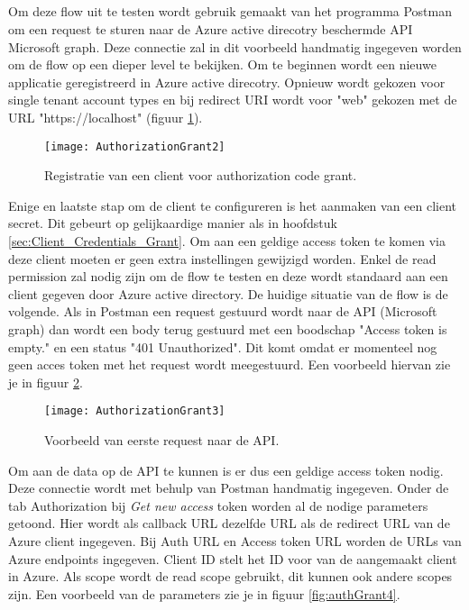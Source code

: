 \subsection{}
Om deze flow uit te testen wordt gebruik gemaakt van het programma Postman om een request te sturen naar de Azure active direcotry beschermde API Microsoft graph. Deze connectie zal in dit voorbeeld handmatig ingegeven worden om de flow op een dieper level te bekijken. Om te beginnen wordt een nieuwe applicatie geregistreerd in Azure active direcotry. Opnieuw wordt gekozen voor single tenant account types en bij redirect URI wordt voor "web" gekozen met de URL "https://localhost" (figuur \ref{fig:authGrant2}).\newpage
\begin{figure}[H]
	\centering
	\texttt{[image: AuthorizationGrant2]} 
	\caption[AthorizationGrant2]{Registratie van een client voor authorization code grant.}
	\label{fig:authGrant2}
	\scriptsize
\end{figure}
Enige en laatste stap om de client te configureren is het aanmaken van een client secret. Dit gebeurt op gelijkaardige manier als in hoofdstuk \ref{sec:Client_Credentials_Grant}. Om aan een geldige access token te komen via deze client moeten er geen extra instellingen gewijzigd worden. Enkel de read permission zal nodig zijn om de flow te testen en deze wordt standaard aan een client gegeven door Azure active directory.\newline
De huidige situatie van de flow is de volgende. Als in Postman een request gestuurd wordt naar de API (Microsoft graph) dan wordt een body terug gestuurd met een boodschap "Access token is empty." en een status "401 Unauthorized". Dit komt omdat er momenteel nog geen acces token met het request wordt meegestuurd. Een voorbeeld hiervan zie je in figuur \ref{fig:authGrant3}.
\begin{figure}[H]
	\centering
	\texttt{[image: AuthorizationGrant3]} 
	\caption[AthorizationGrant3]{Voorbeeld van eerste request naar de API.}
	\label{fig:authGrant3}
	\scriptsize
\end{figure}
Om aan de data op de API te kunnen is er dus een geldige access token nodig. Deze connectie wordt met behulp van Postman handmatig ingegeven. Onder de tab Authorization bij \emph{Get new access} token worden al de nodige parameters getoond. Hier wordt als callback URL dezelfde URL als de redirect URL van de Azure client ingegeven. Bij Auth URL en Access token URL worden de URLs van Azure endpoints ingegeven. Client ID stelt het ID voor van de aangemaakt client in Azure. Als scope wordt de read scope gebruikt, dit kunnen ook andere scopes zijn. Een voorbeeld van de parameters zie je in figuur \ref{fig:authGrant4}.
